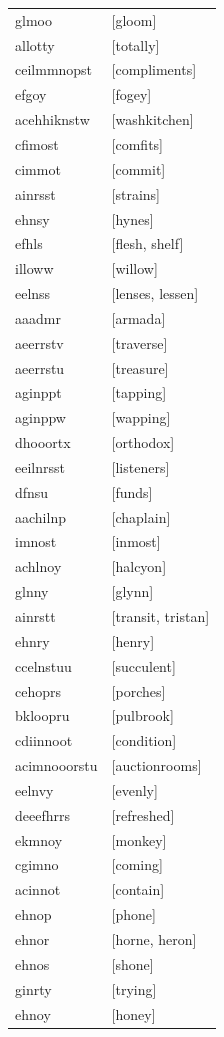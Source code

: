 \documentclass{article}
\begin{document}
\begin{tabular}{ll}
glmoo & [gloom] \\
allotty & [totally] \\
ceilmmnopst & [compliments] \\
efgoy & [fogey] \\
acehhiknstw & [washkitchen] \\
cfimost & [comfits] \\
cimmot & [commit] \\
ainrsst & [strains] \\
ehnsy & [hynes] \\
efhls & [flesh, shelf] \\
illoww & [willow] \\
eelnss & [lenses, lessen] \\
aaadmr & [armada] \\
aeerrstv & [traverse] \\
aeerrstu & [treasure] \\
aginppt & [tapping] \\
aginppw & [wapping] \\
dhooortx & [orthodox] \\
eeilnrsst & [listeners] \\
dfnsu & [funds] \\
aachilnp & [chaplain] \\
imnost & [inmost] \\
achlnoy & [halcyon] \\
glnny & [glynn] \\
ainrstt & [transit, tristan] \\
ehnry & [henry] \\
ccelnstuu & [succulent] \\
cehoprs & [porches] \\
bkloopru & [pulbrook] \\
cdiinnoot & [condition] \\
acimnooorstu & [auctionrooms] \\
eelnvy & [evenly] \\
deeefhrrs & [refreshed] \\
ekmnoy & [monkey] \\
cgimno & [coming] \\
acinnot & [contain] \\
ehnop & [phone] \\
ehnor & [horne, heron] \\
ehnos & [shone] \\
ginrty & [trying] \\
ehnoy & [honey] \\

\end{tabular}
\end{document}

